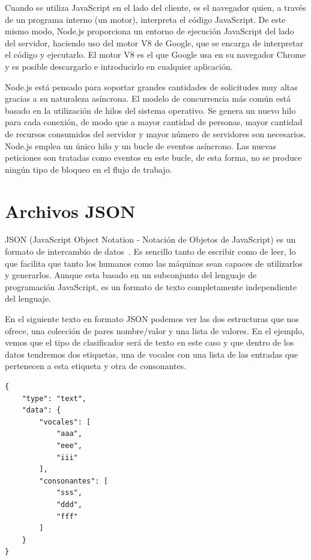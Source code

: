 \documentclass[a4paper, 12pt]{book}
\begin{document}
Cuando se utiliza JavaScript en el lado del cliente, es el navegador quien, a través de un programa interno (un motor), interpreta el código JavaScript. De este mismo modo, Node.js proporciona un entorno de ejecución JavaScript del lado del servidor, haciendo uso del motor V8 de Google, que se encarga de interpretar el código y ejecutarlo.
El motor V8 es el que Google usa en su navegador Chrome y es posible descargarlo e introducirlo en cualquier aplicación.

Node.js está pensado para soportar grandes cantidades de solicitudes muy altas gracias a su naturaleza asíncrona. El modelo de concurrencia más común está basado en la utilización de hilos del sistema operativo. Se genera un nuevo hilo para cada conexión, de modo que a mayor cantidad de personas, mayor cantidad de recursos consumidos del servidor y mayor número de servidores son necesarios. Node.js emplea un único hilo y un bucle de eventos asíncrono. Las nuevas peticiones son tratadas como eventos en este bucle, de esta forma, no se produce ningún tipo de bloqueo en el flujo de trabajo.

\section{Archivos JSON} 
\label{sec:archivosjson}

JSON (JavaScript Object Notation - Notación de Objetos de JavaScript) es un formato de intercambio de datos~\cite{json}. Es sencillo tanto de escribir como de leer, lo que facilita que tanto los humanos como las máquinas sean capaces de utilizarlos y generarlos. Aunque esta basado en un subconjunto del lenguaje de programación JavaScript, es un formato de texto completamente independiente del lenguaje.

En el siguiente texto en formato JSON podemos ver las dos estructuras que nos ofrece, una colección de pares nombre/valor y una lista de valores. En el ejemplo, vemos que el tipo de clasificador será de texto en este caso y que dentro de los datos tendremos dos etiquetas, una de vocales con una lista de las entradas que pertenecen a esta etiqueta y otra de consonantes. 

\begin{verbatim}
{
    "type": "text",
    "data": {
        "vocales": [
            "aaa",
            "eee",
            "iii"
        ],
        "consonantes": [
            "sss",
            "ddd",
            "fff"
        ]
    }
}
\end{verbatim}
\end{document}
